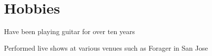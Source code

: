 \documentclass[letterpaper]{resume-shreeram}
\begin{document}
\section{Hobbies}

\begin{compactitem}
  \item Have been playing guitar for over ten years

  \item Performed live shows at various venues such as Forager in San
    Jose
\end{compactitem}
\end{document}
